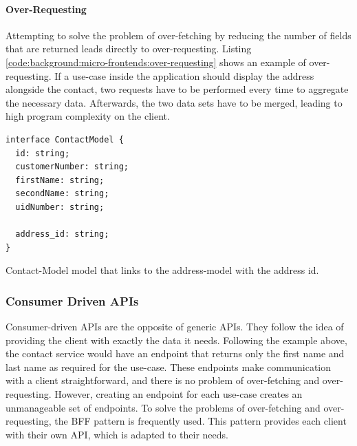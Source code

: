 \paragraph{Over-Requesting}\label{paragraph:background:micro-frontend:generic-vs-consumer-driven-apis:generic-apis:over-requesting}

Attempting to solve the problem of over-fetching by reducing the number of fields that are returned leads directly to over-requesting. Listing \ref{code:background:micro-frontends:over-requesting} shows an example of over-requesting. If a use-case inside the application should display the address alongside the contact, two requests have to be performed every time to aggregate the necessary data. Afterwards, the two data sets have to be merged, leading to high program complexity on the client. \cite{misc:2019:leitner:background:micro-frontends:backend-for-frontends}

\ifshowListings
\begin{listing}[H]
  \begin{verbatim}
interface ContactModel {
  id: string;
  customerNumber: string;
  firstName: string;
  secondName: string;
  uidNumber: string;

  address_id: string;
}
  \end{verbatim}
  \caption{Contact-Model model that links to the address-model with the address id.}\label{code:background:micro-frontends:over-requesting}
\end{listing}
\fi

\subsubsection{Consumer Driven \acp{API}}\label{subsubection:background:micro-frontend:generic-vs-consumer-driven-apis:consumer-driven-apis}

Consumer-driven \acp{API} are the opposite of generic \acp{API}. They follow the idea of providing the client with exactly the data it needs. Following the example above, the contact service would have an endpoint that returns only the first name and last name as required for the use-case. These endpoints make communication with a client straightforward, and there is no problem of over-fetching and over-requesting. However, creating an endpoint for each use-case creates an unmanageable set of endpoints. \cite{misc:2019:leitner:background:micro-frontends:backend-for-frontends} To solve the problems of over-fetching and over-requesting, the \ac{BFF} pattern is frequently used. This pattern provides each client with their own \ac{API}, which is adapted to their needs. \cite{book:2018:richardson:background:bff:microservices-patterns}


